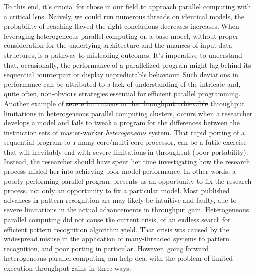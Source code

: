 \documentclass[10pt]{article}[draft]
\begin{document}

To this end, it's crucial for those in our field to approach parallel computing with a critical lens. Naively, we could run numerous threads on identical models, the probability of reaching \st{flawed} the right conclusions decreases \st{increases}. When leveraging heterogeneous parallel computing on a base model, without proper consideration for the underlying architecture and the nuances of input data structures, is a pathway to misleading outcomes. It's imperative to understand that, occasionally, the performance of a parallelized program might lag behind its sequential counterpart or display unpredictable behaviour. Such deviations in performance can be attributed to a lack of understanding of the intricate and, quite often, non-obvious strategies essential for efficient parallel programming.
Another example of \st{severe  limitations in the throughput achievable} throughput limitations in heterogeneous parallel computing clusters, occurs when a researcher develops a model and fails to tweak a program for the differences between the  instruction sets of master-worker \emph{heterogeneous} system.  That rapid porting of a sequential program to a many-core/multi-core processor, can be a futile exercise that will inevitably end with severe limitations in throughput (poor portability). Instead, the researcher should have spent her time investigating how the research process misled her into achieving poor model performance. In other words, a poorly performing parallel program presents us an opportunity to fix the research process, not only an opportunity to fix a particular model. Most published advances in pattern recognition \st{are} may likely be intuitive and faulty, due to severe limitations in the actual advancements in throughput gain. Heterogeneous parallel computing did not cause the current crisis, of an endless  search for efficient pattern recognition algorithm yield. That crisis was caused by the widespread misuse in the application of many-threaded systems to pattern recognition, and poor porting in particular. However, going forward heterogeneous parallel computing can help deal with the problem of limited execution throughput gains in three ways:
		  
\end{document}
